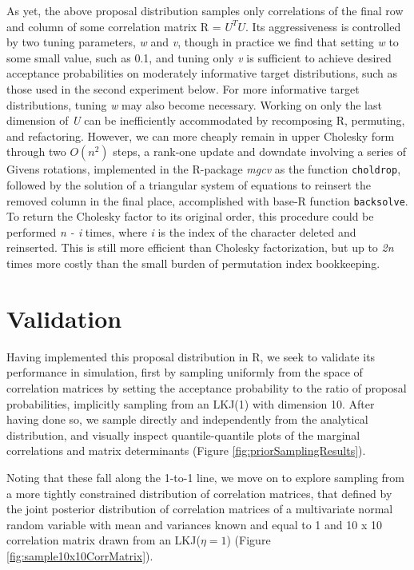As yet, the above proposal distribution samples only correlations of the final row and column of some correlation matrix R = $U^{T}U$. Its aggressiveness is controlled by two tuning parameters, \textit{w} and \textit{v}, though in practice we find that setting \textit{w} to some small value, such as 0.1, and tuning only \textit{v} is sufficient to achieve desired acceptance probabilities on moderately informative target distributions, such as those used in the second experiment below. For more informative target distributions, tuning \textit{w} may also become necessary. Working on only the last dimension of \textit{U} can be inefficiently accommodated by recomposing R, permuting, and refactoring. However, we can more cheaply remain in upper Cholesky form through two $O(n^2)$ steps, a rank-one update and downdate involving a series of Givens rotations, implemented in the R-package \textit{mgcv} \citep{woodPackageMgcv2015} as the function \texttt{choldrop}, followed by the solution of a triangular system of equations to reinsert the removed column in the final place, accomplished with base-R \citep{rcoreteamLanguageEnvironmentStatistical2013} function \texttt{backsolve}. To return the Cholesky factor to its original order, this procedure could be performed \textit{n - i} times, where \textit{i} is the index of the character deleted and reinserted. This is still more efficient than Cholesky factorization, but up to \textit{2n} times more costly than the small burden of permutation index bookkeeping. 

\clearpage

\section{Validation}

Having implemented this proposal distribution in R, we seek to validate its performance in simulation, first by sampling uniformly from the space of correlation matrices by setting the acceptance probability to the ratio of proposal probabilities, implicitly sampling from an LKJ(1) with dimension 10. After having done so, we sample directly and independently from the analytical distribution, and visually inspect quantile-quantile plots of the marginal correlations and matrix determinants (Figure \ref{fig:priorSamplingResults}).

Noting that these fall along the 1-to-1 line, we move on to explore sampling from a more tightly constrained distribution of correlation matrices, that defined by the joint posterior distribution of correlation matrices of a multivariate normal random variable with mean and variances known and equal to 1 and 10 x 10 correlation matrix drawn from an LKJ($\eta = 1$) (Figure \ref{fig:sample10x10CorrMatrix}).

